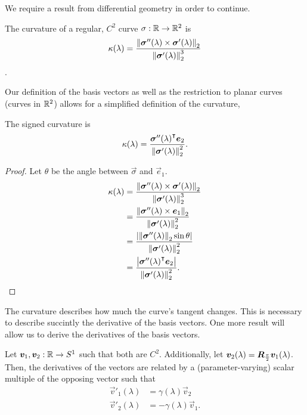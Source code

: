 We require a result from differential geometry in order to continue.
\begin{definition}[Curvature]
    The curvature of a regular, $C^2$ curve $\sigma:\mathbb{R}\to\mathbb{R}^2$ is
    \begin{equation}
        \kappa(\lambda) = \frac{\mathop{}\!\left\|\bm{\sigma}''(\lambda) \times \bm{\sigma}'(\lambda)\right\|_2}{\mathop{}\!\left\|\bm{\sigma}'(\lambda)\right\|_2^3}
    \end{equation}.
\end{definition}
Our definition of the basis vectors as well as the restriction to planar curves (curves in $\mathbb{R}^2$) allows for a simplified definition of the curvature,
\begin{lemma}
    The signed curvature is
    $$\kappa(\lambda) = \frac{{\bm{\sigma}''(\lambda)}^{\intercal}\bm{e}_2}{\mathop{}\!\left\|\bm{\sigma}'(\lambda)\right\|_2^2}.$$
    \label{lem:signed_curvature}
\end{lemma}
\begin{proof}
    Let $\theta$ be the angle between $\vec{\sigma}$ and $\vec{e}_1$.
    \begin{align*}
        \kappa(\lambda) &= \frac{\mathop{}\!\left\|\bm{\sigma}''(\lambda) \times \bm{\sigma}'(\lambda)\right\|_2}{\mathop{}\!\left\|\bm{\sigma}'(\lambda)\right\|_2^3}\\
                        &= \frac{\mathop{}\!\left\|\bm{\sigma}''(\lambda) \times \bm{e}_1\right\|_2}{\mathop{}\!\left\|\bm{\sigma}'(\lambda)\right\|_2^2}\\
                        &= \frac{\left|\mathop{}\!\left\|\bm{\sigma}''(\lambda)\right\|_2\sin \theta \right|}{\mathop{}\!\left\|\bm{\sigma}'(\lambda)\right\|_2^2}\\
                        &= \frac{\left|{\bm{\sigma}''(\lambda)}^{\intercal}\bm{e}_2\right|}{\mathop{}\!\left\|\bm{\sigma}'(\lambda)\right\|_2^2}.\\
    \end{align*}
\end{proof}
The curvature describes how much the curve's tangent changes. This is necessary to describe succintly the derivative of the basis vectors. One more result will allow us to derive the derivatives of the basis vectors.
\begin{lemma}
    Let $\bm{v}_1, \bm{v}_2:\mathbb{R}\to S^1$ such that both are $C^2$. Additionally, let $\bm{v}_2(\lambda)=\bm{R}_{\frac{\pi}{2}}\bm{v}_1(\lambda)$. Then, the derivatives of the vectors are related by a (parameter-varying) scalar multiple of the opposing vector such that
    \begin{align*}
        \vec{v}'_1(\lambda) &= \gamma(\lambda)\vec{v}_2 \\
        \vec{v}'_2(\lambda) &= -\gamma(\lambda)\vec{v}_1.
    \end{align*}
    \label{lem:sf_frame}
\end{lemma}
